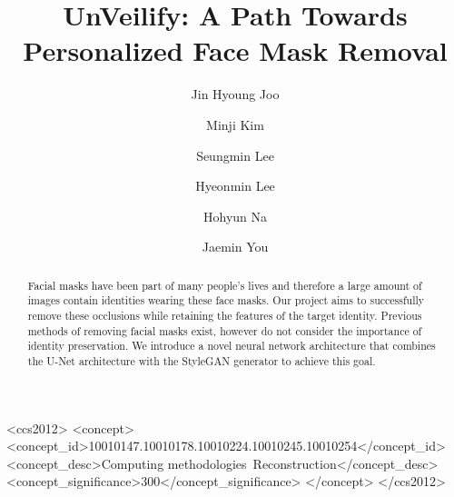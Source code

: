 \documentclass[sigconf]{acmart}
\begin{document}
\title{UnVeilify: A Path Towards Personalized Face Mask Removal}

\author{Jin Hyoung Joo}

\author{Minji Kim}

\author{Seungmin Lee}

\author{Hyeonmin Lee}

\author{Hohyun Na}

\author{Jaemin You}

\begin{abstract}
    Facial masks have been part of many people's lives and therefore a large
    amount of images contain identities wearing these face masks. Our project
    aims to successfully remove these occlusions while retaining the features
    of the target identity. Previous methods of removing facial masks exist,
    however do not consider the importance of identity preservation. We introduce
    a novel neural network architecture that combines the U-Net architecture with
    the StyleGAN generator to achieve this goal.
\end{abstract}

\begin{CCSXML}
<ccs2012>
<concept>
<concept_id>10010147.10010178.10010224.10010245.10010254</concept_id>
<concept_desc>Computing methodologies~Reconstruction</concept_desc>
<concept_significance>300</concept_significance>
</concept>
</ccs2012>
\end{CCSXML}
\end{document}

